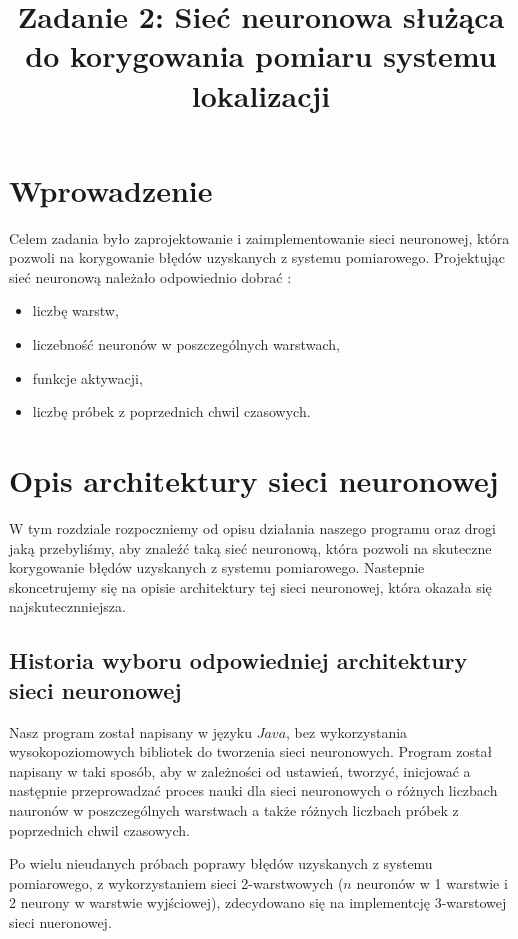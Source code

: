 \documentclass{classrep}
\author{
\studentinfo{Mateusz Walczak}{216911} \and
\studentinfo{Konrad Kajszczak}{216790}
}
\title{Zadanie 2: Sieć neuronowa służąca do korygowania pomiaru systemu lokalizacji}
\begin{document}
\maketitle

\section*{Wprowadzenie}
Celem zadania było zaprojektowanie i zaimplementowanie sieci neuronowej, która pozwoli na korygowanie błędów uzyskanych z systemu pomiarowego. Projektując sieć neuronową należało odpowiednio dobrać \cite{zadanie}:

\begin{itemize}[label=$\bullet$\scshape\bfseries]
\item liczbę warstw,
\item liczebność neuronów w poszczególnych warstwach,
\item funkcje aktywacji,
\item liczbę próbek z poprzednich chwil czasowych.
\end{itemize}

\section{Opis architektury sieci neuronowej}

W tym rozdziale rozpoczniemy od opisu działania naszego programu oraz drogi jaką przebyliśmy, aby znaleźć taką sieć neuronową, która pozwoli na skuteczne korygowanie błędów uzyskanych z systemu pomiarowego. Nastepnie skoncetrujemy się na opisie architektury tej sieci neuronowej, która okazała się najskutecznniejsza. 

\subsection{Historia wyboru odpowiedniej architektury sieci neuronowej}

Nasz program został napisany w języku $Java$, bez wykorzystania wysokopoziomowych bibliotek do tworzenia sieci neuronowych.
Program został napisany w taki sposób, aby w zależności od ustawień, tworzyć, inicjować a następnie przeprowadzać proces nauki dla sieci neuronowych o różnych liczbach nauronów w poszczególnych warstwach a także różnych liczbach próbek z poprzednich chwil czasowych.\newline 

Po wielu nieudanych próbach poprawy błędów uzyskanych z systemu pomiarowego, z wykorzystaniem sieci 2-warstwowych ($n$ neuronów w 1 warstwie i 2 neurony w warstwie wyjściowej), zdecydowano się na implementcję 3-warstowej sieci nueronowej.\newline
\end{document}
